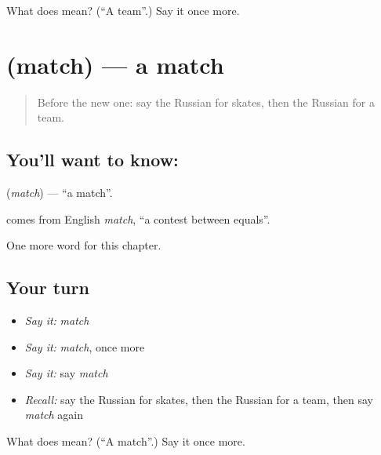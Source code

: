 \begin{tcolorbox}[breakable,colback=teal!4,colframe=teal!35!black,title={Before you move on}]
What does  mean? (\textquotedblleft{}A team\textquotedblright{}.) Say it once more.
\end{tcolorbox}
\section[\texorpdfstring{\ru{матч} (match)}{матч (match)}]{ (match) — a match}

\label{lesson:RU-C166-match}



\begin{quote}
Before the new one: say the Russian for skates, then the Russian for a team.
\end{quote}

\subsection*{You'll want to know: }
\textbf{} (\emph{match}) — \textquotedblleft{}a match\textquotedblright{}.

\begin{cousinweb}
\textbf{} comes from English \emph{match}, \textquotedblleft{}a contest between equals\textquotedblright{}.
\end{cousinweb}

\begin{grammarlens}[title={What you've built}]
One more word for this chapter.
\end{grammarlens}

\subsection*{Your turn}
\begin{itemize}
\raggedright
  \item \emph{Say it:} \emph{match}
  \item \emph{Say it:} \emph{match}, once more
  \item \emph{Say it:} say \emph{match}
  \item \emph{Recall:} say the Russian for skates, then the Russian for a team, then say \emph{match} again
\end{itemize}

\begin{tcolorbox}[breakable,colback=teal!4,colframe=teal!35!black,title={Before you move on}]
What does  mean? (\textquotedblleft{}A match\textquotedblright{}.) Say it once more.
\end{tcolorbox}
